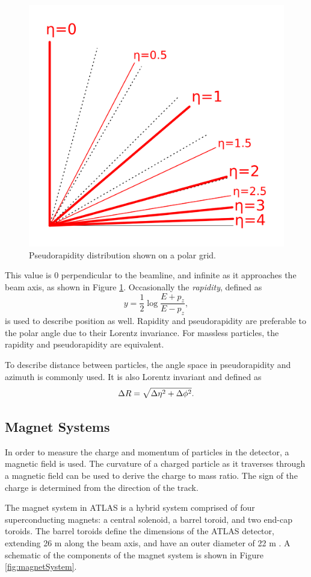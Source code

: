 \begin{figure}[!ht]
    \centering
    \includegraphics[width=.5\textwidth]{chapters/chapter2_experiment/images/Pseudorapidity_plot.png}
    \caption[Pseudorapidity distribution shown on a polar grid]{Pseudorapidity distribution shown on a polar grid.}
    \label{fig:pseudorapidity}
\end{figure}

This value is 0 perpendicular to the beamline, and infinite as it approaches the beam axis, as shown in Figure \ref{fig:pseudorapidity}. Occasionally the \textit{rapidity}, defined as
%
\begin{equation}
    y = \frac{1}{2} \log{\frac{E+p_z}{E-p_z}},
\end{equation}
%
is used to describe position as well. Rapidity and pseudorapidity are preferable to the polar angle due to their Lorentz invariance. For massless particles, the rapidity and pseudorapidity are equivalent.

To describe distance between particles, the angle space in pseudorapidity and azimuth is commonly used. It is also Lorentz invariant and defined as
\begin{equation}
    \Delta R = \sqrt{\Delta\eta^2 + \Delta \phi^2}.
\end{equation}
%

\subsection{Magnet Systems} \label{ssec:magnetsystem}
In order to measure the charge and momentum of particles in the detector, a magnetic field is used. The curvature of a charged particle as it traverses through a magnetic field can be used to derive the charge to mass ratio. The sign of the charge is determined from the direction of the track.

The magnet system in ATLAS is a hybrid system comprised of four superconducting magnets: a central solenoid, a barrel toroid, and two end-cap toroids. The barrel toroids define the dimensions of the ATLAS detector, extending 26 m along the beam axis, and have an outer diameter of 22 m \cite{magnet-system-tdr}. A schematic of the components of the magnet system is shown in Figure \ref{fig:magnetSystem}.

